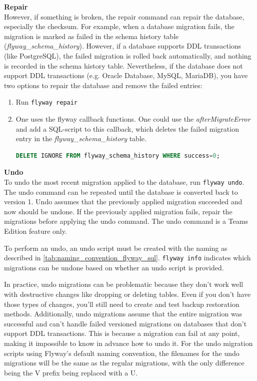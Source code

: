\textbf{Repair}\\
However, if something is broken, the repair command can repair the database, especially the checksum. For example, when a database migration fails, the migration is marked as failed in the schema history table (\textit{flyway\_schema\_history}). However, if a database supports \gls{DDL} transactions (like PostgreSQL), the failed migration is rolled back automatically, and nothing is recorded in the schema history table. Nevertheless, if the database does not support DDL transactions (e.g. Oracle Database, MySQL, MariaDB), you have two options to repair the database and remove the failed entries:

\begin{enumerate}
	\item Run \texttt{flyway repair}\\
	\item One uses the flyway callback functions. One could use the \textit{afterMigrateError} and add a SQL-script to this callback, which deletes the failed migration entry in the \textit{flyway\_schema\_history} table.
	
	\begin{lstlisting}[language=SQL]
		DELETE IGNORE FROM flyway_schema_history WHERE success=0;
	\end{lstlisting}
\end{enumerate}


\textbf{Undo}\\
To undo the most recent migration applied to the database, run \texttt{flyway undo}. The undo command can be repeated until the database is converted back to version 1. Undo assumes that the previously applied migration succeeded and now should be undone. If the previously applied migration fails, repair the migrations before applying the undo command. The undo command is a Teams Edition feature only.

To perform an undo, an undo script must be created with the naming as described in \autoref{tab:naming_convention_flyway_sql}. \texttt{flyway info} indicates which migrations can be undone based on whether an undo script is provided. 

In practice, undo migrations can be problematic because they don't work well with destructive changes like dropping or deleting tables. Even if you don't have those types of changes, you'll still need to create and test backup restoration methods. Additionally, undo migrations assume that the entire migration was successful and can't handle failed versioned migrations on databases that don't support DDL transactions. This is because a migration can fail at any point, making it impossible to know in advance how to undo it.
For the undo migration scripts using Flyway's default naming convention, the filenames for the undo migrations will be the same as the regular migrations, with the only difference being the V prefix being replaced with a U.




